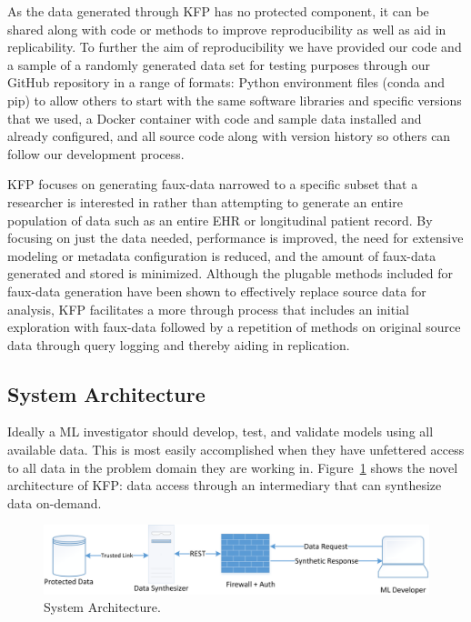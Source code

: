 \documentclass{article}
\begin{document}
As the data generated through KFP has no protected component, it can be shared along with code or methods to improve reproducibility as well as aid in replicability. To further the aim of reproducibility we have provided our code and a sample of a randomly generated data set for testing purposes through our GitHub repository in a range of formats: Python environment files (conda and pip) to allow others to start with the same software libraries and specific versions that we used, a Docker container with code and sample data installed and already configured, and all source code along with version history so others can follow our development process.

KFP focuses on generating faux-data narrowed to a specific subset that a researcher is interested in rather than attempting to generate an entire population of data such as an entire EHR or longitudinal patient record. By focusing on just the data needed, performance is improved, the need for extensive modeling or metadata configuration is reduced, and the amount of faux-data generated and stored is minimized. Although the plugable methods included for faux-data generation have been shown to effectively replace source data for analysis, KFP facilitates a more through process that includes an initial exploration with faux-data followed by a repetition of methods on original source data through query logging and thereby aiding in replication.

\subsection{System Architecture}

Ideally a ML investigator should develop, test, and validate models using all available data. This is most easily accomplished when they have unfettered access to all data in the problem domain they are working in. Figure~\ref{fig:architecture} shows the novel architecture of KFP: data access through an intermediary that can synthesize data on-demand.

\begin{figure}[ht]
  \centering
  \includegraphics[width=\textwidth]{prototype_architecture}
  \caption{System Architecture.}
  \label{fig:architecture}
\end{figure}
\end{document}

